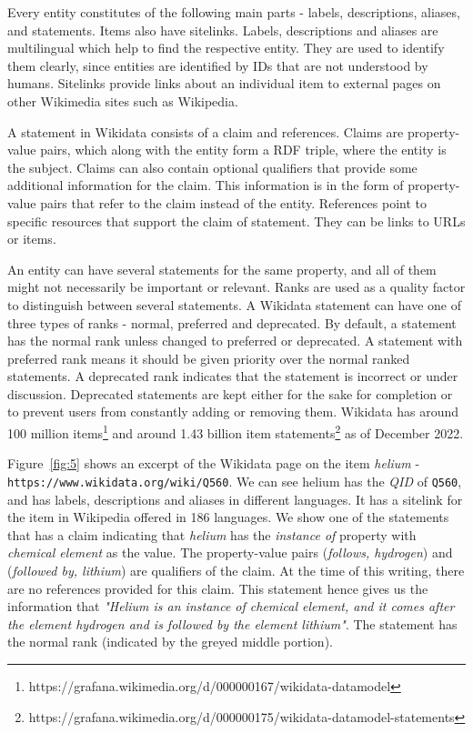 Every entity constitutes of the following main parts - labels, descriptions, aliases, and statements. Items also have sitelinks. Labels, descriptions and aliases are multilingual which help to find the respective entity. They are used to identify them clearly, since entities are identified by IDs that are not understood by humans. Sitelinks provide links about an individual item to external pages on other Wikimedia sites such as Wikipedia. 

A statement in Wikidata consists of a claim and references. Claims are property-value pairs, which along with the entity form a RDF triple, where the entity is the subject. Claims can also contain optional qualifiers that provide some additional information for the claim. This information is in the form of property-value pairs that refer to the claim instead of the entity. References point to specific resources that support the claim of statement. They can be links to URLs or items.

An entity can have several statements for the same property, and all of them might not necessarily be important or relevant. Ranks are used as a quality factor to distinguish between several statements. A Wikidata statement can have one of three types of ranks - normal, preferred and deprecated. By default, a statement has the normal rank unless changed to preferred or deprecated. A statement with preferred rank means it should be given priority over the normal ranked statements. A deprecated rank indicates that the statement is incorrect or under discussion. Deprecated statements are kept either for the sake for completion or to prevent users from constantly adding or removing them. Wikidata has around 100 million items\footnote{https://grafana.wikimedia.org/d/000000167/wikidata-datamodel} and around 1.43 billion item statements\footnote{https://grafana.wikimedia.org/d/000000175/wikidata-datamodel-statements} as of December 2022. 

Figure~\ref{fig:5} shows an excerpt of the Wikidata page on the item \textit{helium} - \texttt{https://www.wikidata.org/wiki/Q560}. We can see helium has the \textit{QID} of \texttt{Q560}, and has labels, descriptions and aliases in different languages. It has a sitelink for the item in Wikipedia offered in 186 languages. We show one of the statements that has a claim indicating that \textit{helium} has the \textit{instance of} property with \textit{chemical element} as the value. The property-value pairs (\textit{follows, hydrogen}) and (\textit{followed by, lithium}) are qualifiers of the claim. At the time of this writing, there are no references provided for this claim. This statement hence gives us the information that \textit{"Helium is an instance of chemical element, and it comes after the element hydrogen and is followed by the element lithium"}. The statement has  the normal rank (indicated by the greyed middle portion). 

